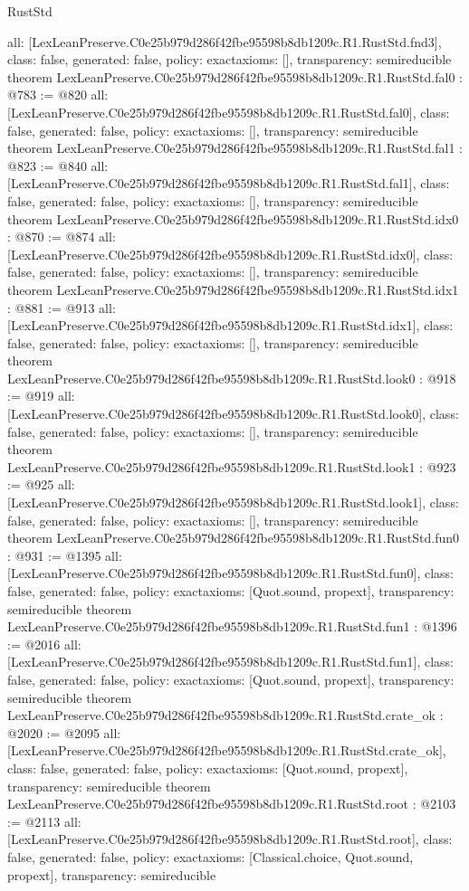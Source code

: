 \begin{lexlean}{RustStd}
\begin{coremodule}
{  all: [LexLeanPreserve.C0e25b979d286f42fbe95598b8db1209c.R1.RustStd.fnd3],
  class: false,
  generated: false,
  policy: exact{axioms: []},
  transparency: semireducible
}
theorem LexLeanPreserve.C0e25b979d286f42fbe95598b8db1209c.R1.RustStd.fal0 : @783 := @820 {
  all: [LexLeanPreserve.C0e25b979d286f42fbe95598b8db1209c.R1.RustStd.fal0],
  class: false,
  generated: false,
  policy: exact{axioms: []},
  transparency: semireducible
}
theorem LexLeanPreserve.C0e25b979d286f42fbe95598b8db1209c.R1.RustStd.fal1 : @823 := @840 {
  all: [LexLeanPreserve.C0e25b979d286f42fbe95598b8db1209c.R1.RustStd.fal1],
  class: false,
  generated: false,
  policy: exact{axioms: []},
  transparency: semireducible
}
theorem LexLeanPreserve.C0e25b979d286f42fbe95598b8db1209c.R1.RustStd.idx0 : @870 := @874 {
  all: [LexLeanPreserve.C0e25b979d286f42fbe95598b8db1209c.R1.RustStd.idx0],
  class: false,
  generated: false,
  policy: exact{axioms: []},
  transparency: semireducible
}
theorem LexLeanPreserve.C0e25b979d286f42fbe95598b8db1209c.R1.RustStd.idx1 : @881 := @913 {
  all: [LexLeanPreserve.C0e25b979d286f42fbe95598b8db1209c.R1.RustStd.idx1],
  class: false,
  generated: false,
  policy: exact{axioms: []},
  transparency: semireducible
}
theorem LexLeanPreserve.C0e25b979d286f42fbe95598b8db1209c.R1.RustStd.look0 : @918 := @919 {
  all: [LexLeanPreserve.C0e25b979d286f42fbe95598b8db1209c.R1.RustStd.look0],
  class: false,
  generated: false,
  policy: exact{axioms: []},
  transparency: semireducible
}
theorem LexLeanPreserve.C0e25b979d286f42fbe95598b8db1209c.R1.RustStd.look1 : @923 := @925 {
  all: [LexLeanPreserve.C0e25b979d286f42fbe95598b8db1209c.R1.RustStd.look1],
  class: false,
  generated: false,
  policy: exact{axioms: []},
  transparency: semireducible
}
theorem LexLeanPreserve.C0e25b979d286f42fbe95598b8db1209c.R1.RustStd.fun0 : @931 := @1395 {
  all: [LexLeanPreserve.C0e25b979d286f42fbe95598b8db1209c.R1.RustStd.fun0],
  class: false,
  generated: false,
  policy: exact{axioms: [Quot.sound, propext]},
  transparency: semireducible
}
theorem LexLeanPreserve.C0e25b979d286f42fbe95598b8db1209c.R1.RustStd.fun1 : @1396 := @2016 {
  all: [LexLeanPreserve.C0e25b979d286f42fbe95598b8db1209c.R1.RustStd.fun1],
  class: false,
  generated: false,
  policy: exact{axioms: [Quot.sound, propext]},
  transparency: semireducible
}
theorem LexLeanPreserve.C0e25b979d286f42fbe95598b8db1209c.R1.RustStd.crate_ok : @2020 := @2095 {
  all: [LexLeanPreserve.C0e25b979d286f42fbe95598b8db1209c.R1.RustStd.crate_ok],
  class: false,
  generated: false,
  policy: exact{axioms: [Quot.sound, propext]},
  transparency: semireducible
}
theorem LexLeanPreserve.C0e25b979d286f42fbe95598b8db1209c.R1.RustStd.root : @2103 := @2113 {
  all: [LexLeanPreserve.C0e25b979d286f42fbe95598b8db1209c.R1.RustStd.root],
  class: false,
  generated: false,
  policy: exact{axioms: [Classical.choice, Quot.sound, propext]},
  transparency: semireducible
}


\end{coremodule}
\end{lexlean}
